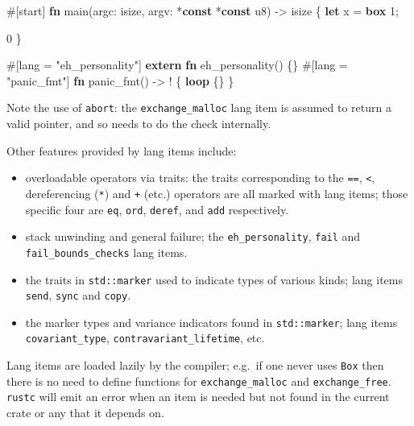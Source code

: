\documentclass[a4paper,]{book}
\newenvironment{Shaded}{\begin{snugshade}}{\end{snugshade}}
\newcommand{\KeywordTok}[1]{\textcolor[rgb]{0.13,0.29,0.53}{\textbf{{#1}}}}
\newcommand{\DataTypeTok}[1]{\textcolor[rgb]{0.13,0.29,0.53}{{#1}}}
\newcommand{\DecValTok}[1]{\textcolor[rgb]{0.00,0.00,0.81}{{#1}}}
\newcommand{\StringTok}[1]{\textcolor[rgb]{0.31,0.60,0.02}{{#1}}}
\newcommand{\AttributeTok}[1]{\textcolor[rgb]{0.77,0.63,0.00}{{#1}}}
\newcommand{\NormalTok}[1]{{#1}}
\providecommand{\tightlist}{%
  \setlength{\itemsep}{0pt}\setlength{\parskip}{0pt}}
\begin{document}
\begin{Shaded}
\begin{Highlighting}[]
\AttributeTok{#[}\NormalTok{start}\AttributeTok{]}
\KeywordTok{fn} \NormalTok{main(argc: }\DataTypeTok{isize}\NormalTok{, argv: *}\KeywordTok{const} \NormalTok{*}\KeywordTok{const} \DataTypeTok{u8}\NormalTok{) -> }\DataTypeTok{isize} \NormalTok{\{}
    \KeywordTok{let} \NormalTok{x = }\KeywordTok{box} \DecValTok{1}\NormalTok{;}

    \DecValTok{0}
\NormalTok{\}}

\AttributeTok{#[}\NormalTok{lang }\AttributeTok{=} \StringTok{"eh_personality"}\AttributeTok{]} \KeywordTok{extern} \KeywordTok{fn} \NormalTok{eh_personality() \{\}}
\AttributeTok{#[}\NormalTok{lang }\AttributeTok{=} \StringTok{"panic_fmt"}\AttributeTok{]} \KeywordTok{fn} \NormalTok{panic_fmt() -> ! \{ }\KeywordTok{loop} \NormalTok{\{\} \}}
\end{Highlighting}
\end{Shaded}

Note the use of \texttt{abort}: the \texttt{exchange\_malloc} lang item
is assumed to return a valid pointer, and so needs to do the check
internally.

Other features provided by lang items include:

\begin{itemize}
\tightlist
\item
  overloadable operators via traits: the traits corresponding to the
  \texttt{==}, \texttt{\textless{}}, dereferencing (\texttt{*}) and
  \texttt{+} (etc.) operators are all marked with lang items; those
  specific four are \texttt{eq}, \texttt{ord}, \texttt{deref}, and
  \texttt{add} respectively.
\item
  stack unwinding and general failure; the \texttt{eh\_personality},
  \texttt{fail} and \texttt{fail\_bounds\_checks} lang items.
\item
  the traits in \texttt{std::marker} used to indicate types of various
  kinds; lang items \texttt{send}, \texttt{sync} and \texttt{copy}.
\item
  the marker types and variance indicators found in
  \texttt{std::marker}; lang items \texttt{covariant\_type},
  \texttt{contravariant\_lifetime}, etc.
\end{itemize}

Lang items are loaded lazily by the compiler; e.g.~if one never uses
\texttt{Box} then there is no need to define functions for
\texttt{exchange\_malloc} and \texttt{exchange\_free}. \texttt{rustc}
will emit an error when an item is needed but not found in the current
crate or any that it depends on.
\end{document}
